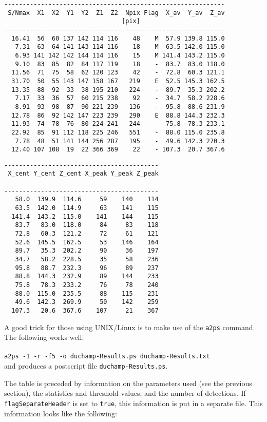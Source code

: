 {\begin{verbatim}
------------------------------------------------------------
 S/Nmax  X1  X2  Y1  Y2  Z1  Z2  Npix Flag  X_av  Y_av  Z_av
                                [pix]                       
------------------------------------------------------------
  16.41  56  60 137 142 114 116    48    M  57.9 139.8 115.0
   7.31  63  64 141 143 114 116    18    M  63.5 142.0 115.0
   6.93 141 142 142 144 114 116    15    M 141.4 143.2 115.0
   9.10  83  85  82  84 117 119    18    -  83.7  83.0 118.0
  11.56  71  75  58  62 120 123    42    -  72.8  60.3 121.1
  31.70  50  55 143 147 158 167   219    E  52.5 145.3 162.5
  13.35  88  92  33  38 195 210   224    -  89.7  35.3 202.2
   7.17  33  36  57  60 215 238    92    -  34.7  58.2 228.6
   8.91  93  98  87  90 221 239   136    -  95.8  88.6 231.9
  12.78  86  92 142 147 223 239   290    E  88.8 144.3 232.3
  11.93  74  78  76  80 224 241   244    -  75.8  78.3 233.1
  22.92  85  91 112 118 225 246   551    -  88.0 115.0 235.8
   7.78  48  51 141 144 256 287   195    -  49.6 142.3 270.3
  12.40 107 108  19  22 366 369    22    - 107.3  20.7 367.6
\end{verbatim}
\newpage
\begin{verbatim}
------------------------------------------
 X_cent Y_cent Z_cent X_peak Y_peak Z_peak
                                          
------------------------------------------
   58.0  139.9  114.6     59    140    114
   63.5  142.0  114.9     63    141    115
  141.4  143.2  115.0    141    144    115
   83.7   83.0  118.0     84     83    118
   72.8   60.3  121.2     72     61    121
   52.6  145.5  162.5     53    146    164
   89.7   35.3  202.2     90     36    197
   34.7   58.2  228.5     35     58    236
   95.8   88.7  232.3     96     89    237
   88.8  144.3  232.9     89    144    233
   75.8   78.3  233.2     76     78    240
   88.0  115.0  235.5     88    115    231
   49.6  142.3  269.9     50    142    259
  107.3   20.6  367.6    107     21    367
\end{verbatim}
}

A good trick for those using UNIX/Linux is to make use of the
\texttt{a2ps} command. The following works well:\\
\\\verb|a2ps -1 -r -f5 -o duchamp-Results.ps duchamp-Results.txt|\\
and produces a postscript file \texttt{duchamp-Results.ps}.

The table is preceded by information on the parameters used (see the
previous section), the statistics and threshold values, and the number
of detections. If \texttt{flagSeparateHeader} is set to \texttt{true},
this information is put in a separate file. This information looks
like the following:

